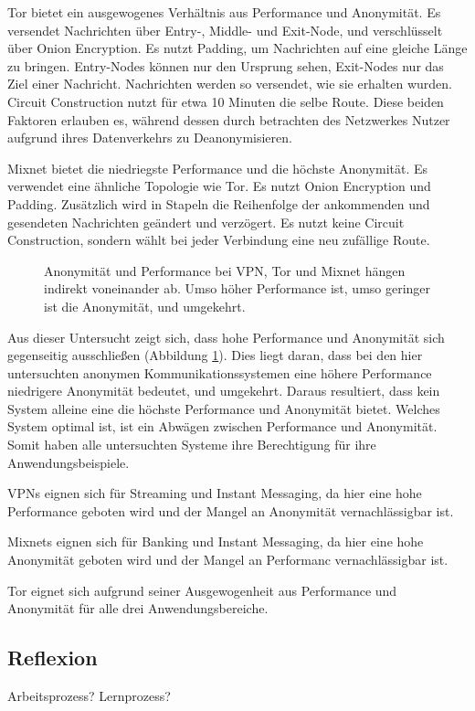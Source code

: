 Tor bietet ein ausgewogenes Verhältnis aus Performance und Anonymität. Es versendet Nachrichten über Entry-, Middle- und Exit-Node, und verschlüsselt über Onion Encryption. Es nutzt Padding, um Nachrichten auf eine gleiche Länge zu bringen. Entry-Nodes können nur den Ursprung sehen, Exit-Nodes nur das Ziel einer Nachricht. Nachrichten werden so versendet, wie sie erhalten wurden. Circuit Construction nutzt für etwa 10 Minuten die selbe Route. Diese beiden Faktoren erlauben es, während dessen durch betrachten des Netzwerkes Nutzer aufgrund ihres Datenverkehrs zu Deanonymisieren.

Mixnet bietet die niedriegste Performance und die höchste Anonymität. Es verwendet eine ähnliche Topologie wie Tor. Es nutzt Onion Encryption und Padding. Zusätzlich wird in Stapeln die Reihenfolge der ankommenden und gesendeten Nachrichten geändert und verzögert. Es nutzt keine Circuit Construction, sondern wählt bei jeder Verbindung eine neu zufällige Route.

\begin{figure}[h!]
    \centering
    
    \caption{Anonymität und Performance bei VPN, Tor und Mixnet hängen indirekt voneinander ab. Umso höher Performance ist, umso geringer ist die Anonymität, und umgekehrt.}
    \label{imgs:systems_discussion}
\end{figure}

Aus dieser Untersucht zeigt sich, dass hohe Performance und Anonymität sich gegenseitig ausschließen (Abbildung \ref{imgs:systems_discussion}). Dies liegt daran, dass bei den hier untersuchten anonymen Kommunikationssystemen eine höhere Performance niedrigere Anonymität bedeutet, und umgekehrt. Daraus resultiert, dass kein System alleine eine die höchste Performance und Anonymität bietet. Welches System optimal ist, ist ein Abwägen zwischen Performance und Anonymität. Somit haben alle untersuchten Systeme ihre Berechtigung für ihre Anwendungsbeispiele.

VPNs eignen sich für Streaming und Instant Messaging, da hier eine hohe Performance geboten wird und der Mangel an Anonymität vernachlässigbar ist.

Mixnets eignen sich für Banking und Instant Messaging, da hier eine hohe Anonymität geboten wird und der Mangel an Performanc vernachlässigbar ist.

Tor eignet sich aufgrund seiner Ausgewogenheit aus Performance und Anonymität für alle drei Anwendungsbereiche.

\subsection{Reflexion}

Arbeitsprozess? Lernprozess?
